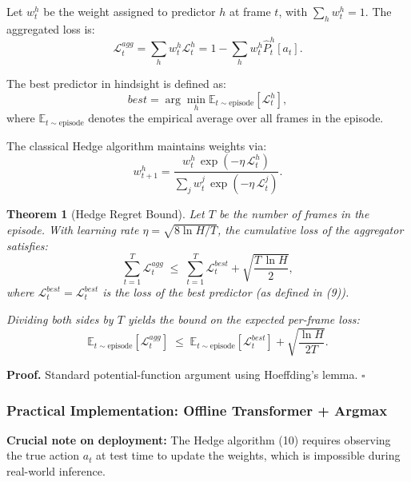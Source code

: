\documentclass[11pt]{article}
\newtheorem{theorem}{Theorem}
\begin{document}
Let \(w^h_t\) be the weight assigned to predictor \(h\) at frame \(t\), with \(\sum_h w^h_t = 1\). The aggregated loss is:
\[
\mathcal{L}^{agg}_t = \sum_h w^h_t \mathcal{L}^h_t = 1 - \sum_h w^h_t \hat{P}^h_t[a_t]. \tag{8}
\]

The best predictor in hindsight is defined as:
\[
best = \arg\min_h \mathbb{E}_{t \sim \text{episode}}[\mathcal{L}^h_t], \tag{9}
\]
where \(\mathbb{E}_{t \sim \text{episode}}\) denotes the empirical average over all frames in the episode.

The classical Hedge algorithm maintains weights via:
\[
w^{h}_{t+1} =
\frac{
  w^{h}_t \,\exp(-\eta\,\mathcal{L}^h_t)
}{
  \sum_j w^{j}_t \,\exp(-\eta\,\mathcal{L}^j_t)
}. \tag{10}
\]

\begin{theorem}[Hedge Regret Bound]
Let \(T\) be the number of frames in the episode. With learning rate \(\eta = \sqrt{8\ln H / T}\), the cumulative loss of the aggregator satisfies:
\[
\sum_{t=1}^T \mathcal{L}^{agg}_t \;\le\; \sum_{t=1}^T \mathcal{L}^{best}_t + \sqrt{\frac{T\,\ln H}{2}}, \tag{11}
\]
where \(\mathcal{L}^{best}_t = \mathcal{L}^{best}_t\) is the loss of the best predictor (as defined in (9)).

Dividing both sides by \(T\) yields the bound on the expected per-frame loss:
\[
\mathbb{E}_{t \sim \text{episode}}[\mathcal{L}^{agg}_t]
\;\le\;
\mathbb{E}_{t \sim \text{episode}}[\mathcal{L}^{best}_t]
+
\sqrt{\frac{\ln H}{2T}}. \tag{12}
\]
\end{theorem}
\textbf{Proof.} Standard potential-function argument using Hoeffding's lemma. \(\square\)

\subsubsection{Practical Implementation: Offline Transformer + Argmax}

\textbf{Crucial note on deployment:} The Hedge algorithm (10) requires observing the true action \(a_t\) at test time to update the weights, which is impossible during real-world inference.
\end{document}
